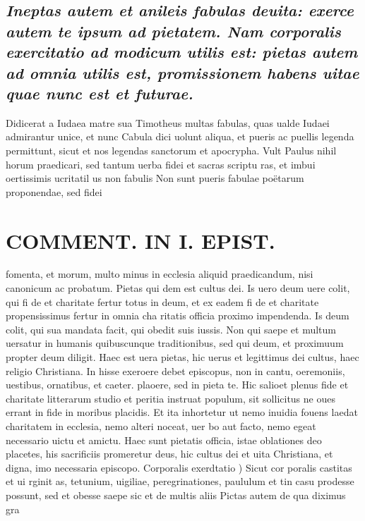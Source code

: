 \documentclass{article}
\begin{document}
\begin{pages}
\subsection*{\textit{Ineptas autem et anileis fabulas deuita: exerce autem te ipsum ad pietatem. Nam corporalis exercitatio ad modicum utilis est: pietas autem ad omnia utilis est, promissionem habens uitae quae nunc est et futurae. }}\pstart Didicerat a Iudaea matre sua Timotheus multas fabulas, quas ualde Iudaei admirantur unice, et nunc Cabula dici uolunt aliqua, et pueris ac puellis legenda permittunt, sicut et nos legendas sanctorum et apocrypha. Vult Paulus nihil horum praedicari, sed tantum uerba fidei et sacras scriptu ras, et imbui oertissimis ucritatil us non fabulis Non sunt pueris fabulae poëtarum proponendae, sed fidei  \pend
\section*{COMMENT. IN I. EPIST. }
\marginpar{[ p.104 ]}\pstart fomenta, et morum, multo minus in ecclesia aliquid praedicandum, nisi canonicum ac probatum. Pietas qui dem est cultus dei. Is uero deum uere colit, qui fi de et charitate fertur totus in deum, et ex eadem fi de et charitate propensissimus fertur in omnia cha ritatis officia proximo impendenda. Is deum colit, qui sua mandata facit, qui obedit suis iussis. Non qui saepe et multum uersatur in humanis quibuscunque  traditionibus, sed qui deum, et proximuum propter deum diligit. Haec est uera pietas, hic uerus et legittimus dei cultus, haec religio Christiana. In hisse exeroere debet episcopus, non in cantu, oeremoniis, uestibus, ornatibus, et caeter. plaoere, sed in pieta te. Hic salioet plenus fide et charitate litterarum studio et peritia instruat populum, sit sollicitus ne oues errant in fide in moribus placidis. Et ita inhortetur ut nemo inuidia fouens laedat charitatem in ecclesia, nemo alteri noceat, uer bo aut facto, nemo egeat necessario uictu et amictu. Haec sunt pietatis officia, istae oblationes deo placetes, his sacrificiis promeretur deus, hic cultus dei et uita Christiana, et digna, imo necessaria episcopo.  \pend\pstart Corporalis exerdtatio ) Sicut cor poralis castitas et ui rginit as, tetunium, uigiliae, peregrinationes, paululum et tin casu prodesse possunt, sed et obesse saepe sic et de multis aliis Pictas autem de qua diximus gra  \pend

\end{pages}
\end{document}
